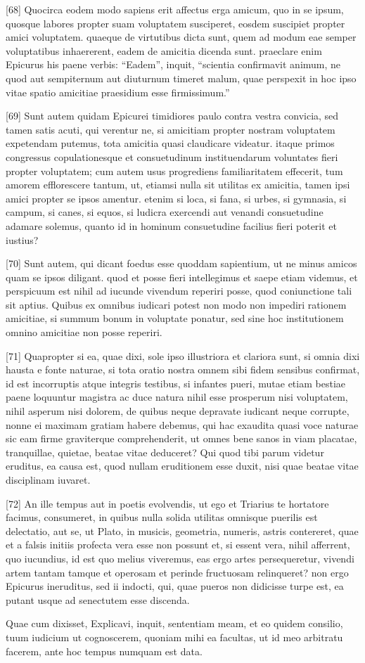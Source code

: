\documentclass{article}
\begin{document}
[68] Quocirca eodem modo sapiens erit affectus erga amicum, quo in se ipsum, quosque labores propter suam voluptatem susciperet, eosdem suscipiet propter amici voluptatem. quaeque de virtutibus dicta sunt, quem ad modum eae semper voluptatibus inhaererent, eadem de amicitia dicenda sunt. praeclare enim Epicurus his paene verbis: ``Eadem'', inquit, ``scientia confirmavit animum, ne quod aut sempiternum aut diuturnum timeret malum, quae perspexit in hoc ipso vitae spatio amicitiae praesidium esse firmissimum.''

[69] Sunt autem quidam Epicurei timidiores paulo contra vestra convicia, sed tamen satis acuti, qui verentur ne, si amicitiam propter nostram voluptatem expetendam putemus, tota amicitia quasi claudicare videatur. itaque primos congressus copulationesque et consuetudinum instituendarum voluntates fieri propter voluptatem; cum autem usus progrediens familiaritatem effecerit, tum amorem efflorescere tantum, ut, etiamsi nulla sit utilitas ex amicitia, tamen ipsi amici propter se ipsos amentur. etenim si loca, si fana, si urbes, si gymnasia, si campum, si canes, si equos, si ludicra exercendi aut venandi consuetudine adamare solemus, quanto id in hominum consuetudine facilius fieri poterit et iustius?

[70] Sunt autem, qui dicant foedus esse quoddam sapientium, ut ne minus amicos quam se ipsos diligant. quod et posse fieri intellegimus et saepe etiam videmus, et perspicuum est nihil ad iucunde vivendum reperiri posse, quod coniunctione tali sit aptius. Quibus ex omnibus iudicari potest non modo non impediri rationem amicitiae, si summum bonum in voluptate ponatur, sed sine hoc institutionem omnino amicitiae non posse reperiri.

[71] Quapropter si ea, quae dixi, sole ipso illustriora et clariora sunt, si omnia dixi hausta e fonte naturae, si tota oratio nostra omnem sibi fidem sensibus confirmat, id est incorruptis atque integris testibus, si infantes pueri, mutae etiam bestiae paene loquuntur magistra ac duce natura nihil esse prosperum nisi voluptatem, nihil asperum nisi dolorem, de quibus neque depravate iudicant neque corrupte, nonne ei maximam gratiam habere debemus, qui hac exaudita quasi voce naturae sic eam firme graviterque comprehenderit, ut omnes bene sanos in viam placatae, tranquillae, quietae, beatae vitae deduceret? Qui quod tibi parum videtur eruditus, ea causa est, quod nullam eruditionem esse duxit, nisi quae beatae vitae disciplinam iuvaret.

[72] An ille tempus aut in poetis evolvendis, ut ego et Triarius te hortatore facimus, consumeret, in quibus nulla solida utilitas omnisque puerilis est delectatio, aut se, ut Plato, in musicis, geometria, numeris, astris contereret, quae et a falsis initiis profecta vera esse non possunt et, si essent vera, nihil afferrent, quo iucundius, id est quo melius viveremus, eas ergo artes persequeretur, vivendi artem tantam tamque et operosam et perinde fructuosam relinqueret? non ergo Epicurus ineruditus, sed ii indocti, qui, quae pueros non didicisse turpe est, ea putant usque ad senectutem esse discenda.

Quae cum dixisset, Explicavi, inquit, sententiam meam, et eo quidem consilio, tuum iudicium ut cognoscerem, quoniam mihi ea facultas, ut id meo arbitratu facerem, ante hoc tempus numquam est data.
\end{document}
